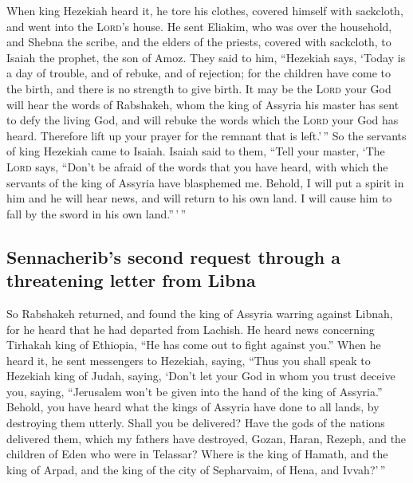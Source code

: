  When king Hezekiah heard it, he tore his clothes, covered
himself with sackcloth, and went into the \textsc{Lord}'s house.
 He sent Eliakim, who was over the household, and Shebna
the scribe, and the elders of the priests, covered with sackcloth, to
Isaiah the prophet, the son of Amoz.  They said to him,
``Hezekiah says, `Today is a day of trouble, and of rebuke, and of
rejection; for the children have come to the birth, and there is no
strength to give birth.  It may be the \textsc{Lord} your
God will hear the words of Rabshakeh, whom the king of Assyria his
master has sent to defy the living God, and will rebuke the words which
the \textsc{Lord} your God has heard. Therefore lift up your prayer for
the remnant that is left.'\,''  So the servants of king
Hezekiah came to Isaiah.  Isaiah said to them, ``Tell your
master, `The \textsc{Lord} says, ``Don't be afraid of the words that you
have heard, with which the servants of the king of Assyria have
blasphemed me.  Behold, I will put a spirit in him and he
will hear news, and will return to his own land. I will cause him to
fall by the sword in his own land.''\,'\,''

\hypertarget{sennacheribs-second-request-through-a-threatening-letter-from-libna}{%
\subsection{Sennacherib's second request through a threatening letter
from
Libna}\label{sennacheribs-second-request-through-a-threatening-letter-from-libna}}

 So Rabshakeh returned, and found the king of Assyria
warring against Libnah, for he heard that he had departed from Lachish.
 He heard news concerning Tirhakah king of Ethiopia, ``He
has come out to fight against you.'' When he heard it, he sent
messengers to Hezekiah, saying,  ``Thus you shall speak
to Hezekiah king of Judah, saying, `Don't let your God in whom you trust
deceive you, saying, ``Jerusalem won't be given into the hand of the
king of Assyria.''  Behold, you have heard what the kings
of Assyria have done to all lands, by destroying them utterly. Shall you
be delivered?  Have the gods of the nations delivered
them, which my fathers have destroyed, Gozan, Haran, Rezeph, and the
children of Eden who were in Telassar?  Where is the king
of Hamath, and the king of Arpad, and the king of the city of
Sepharvaim, of Hena, and Ivvah?'\,''

